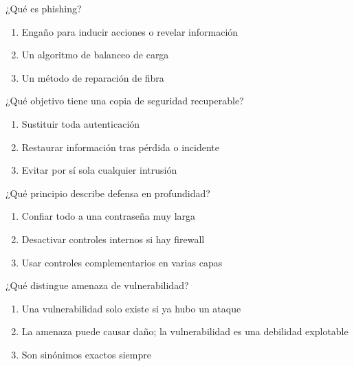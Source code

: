 \noindent\begin{minipage}{\linewidth}\setlength{\parskip}{4pt}\label{q:R-068}
¿Qué es phishing?
\begin{enumerate}[label=\Alph*),nosep]
\item Engaño para inducir acciones o revelar información
\item Un algoritmo de balanceo de carga
\item Un método de reparación de fibra
\end{enumerate}\end{minipage}\par\medskip

\noindent\begin{minipage}{\linewidth}\setlength{\parskip}{4pt}\label{q:R-069}
¿Qué objetivo tiene una copia de seguridad recuperable?
\begin{enumerate}[label=\Alph*),nosep]
\item Sustituir toda autenticación
\item Restaurar información tras pérdida o incidente
\item Evitar por sí sola cualquier intrusión
\end{enumerate}\end{minipage}\par\medskip

\noindent\begin{minipage}{\linewidth}\setlength{\parskip}{4pt}\label{q:R-070}
¿Qué principio describe defensa en profundidad?
\begin{enumerate}[label=\Alph*),nosep]
\item Confiar todo a una contraseña muy larga
\item Desactivar controles internos si hay firewall
\item Usar controles complementarios en varias capas
\end{enumerate}\end{minipage}\par\medskip

\noindent\begin{minipage}{\linewidth}\setlength{\parskip}{4pt}\label{q:R-071}
¿Qué distingue amenaza de vulnerabilidad?
\begin{enumerate}[label=\Alph*),nosep]
\item Una vulnerabilidad solo existe si ya hubo un ataque
\item La amenaza puede causar daño; la vulnerabilidad es una debilidad explotable
\item Son sinónimos exactos siempre
\end{enumerate}\end{minipage}\par\medskip


